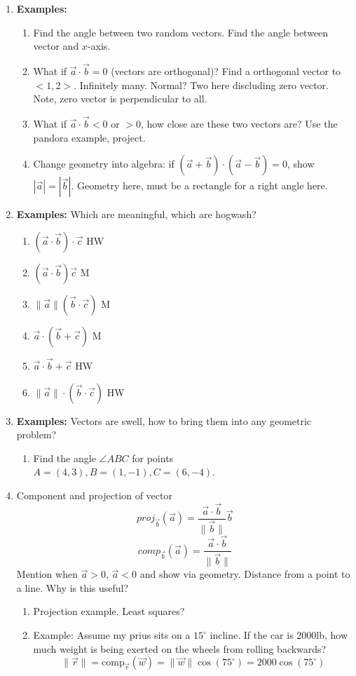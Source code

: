 \documentclass{article}
\begin{document}
\begin{enumerate}
\item {\bf Examples:}
\begin{enumerate}
\item Find the angle between two random vectors. Find the angle between vector and $x$-axis.
\item What if $\vec a\cdot\vec b = 0$ (vectors are orthogonal)? Find a orthogonal vector to $<1,2>$. Infinitely many. Normal? Two here discluding zero vector. Note, zero vector is perpendicular to all.
\item What if $\vec a\cdot\vec b < 0$ or $>0$, how close are these two vectors are? Use the pandora example, project.
\item Change geometry into algebra: if $(\vec a+\vec b)\cdot(\vec a-\vec b)=0$, show $|\vec a|= |\vec b|$. Geometry here, must be a rectangle for a right angle here.
\end{enumerate}

\item {\bf Examples:} Which are meaningful, which are hogwash?
\begin{enumerate}
\item $(\vec{a}\cdot \vec{b})\cdot \vec{c}$ \quad HW
\item $(\vec{a}\cdot \vec{b})\vec{c}$  \quad M
\item $\|\vec{a}\|(\vec{b}\cdot \vec{c})$ \quad  M
\item $\vec{a}\cdot (\vec{b} + \vec{c})$ \quad  M
\item $\vec{a}\cdot \vec{b} + \vec{c}$ \quad  HW
\item $\|\vec{a}\|\cdot (\vec{b}\cdot \vec{c})$ \quad  HW
\end{enumerate}

\item {\bf Examples:} Vectors are swell, how to bring them into any geometric problem?
\begin{enumerate}
\item Find the angle $\angle ABC$ for points $A=(4,3), B=(1,-1), C=(6,-4)$.
\end{enumerate}

\item Component and projection of vector
$$
proj_{\vec b}\left(\vec a\right) = \frac{\vec a\cdot\vec b}{\|\vec{b}\|}\vec b
$$
$$
comp_{\vec b}\left(\vec a\right) = \frac{\vec a\cdot\vec b}{\|\vec b\|}
$$
Mention when $\vec  a>0$, $\vec a <0$ and show via geometry. Distance from a point to a line. Why is this useful?
\begin{enumerate}
\item Projection example. Least squares?
\item Example: Assume my prius sits on a $15^{\circ}$ incline. If the car is 2000lb, how much weight is being exerted on the wheels from rolling backwards?
\[
\| \vec{r} \| = \text{comp}_{\vec{r}} (\vec{w} ) = \|\vec{w}\| \cos(75^{\circ}) = 2000\cos(75^{\circ})
\]
\end{enumerate}


\end{enumerate}
\end{document}
